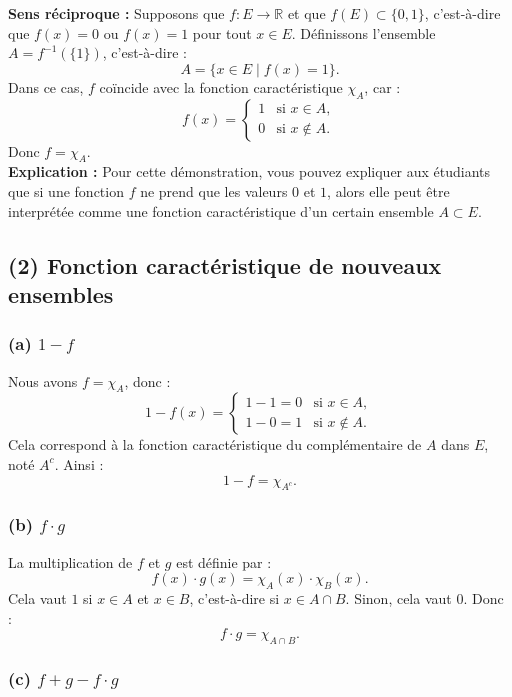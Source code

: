 \documentclass[a4paper,oneside,12pt]{amsbook}
\theoremstyle{definition}
\theoremstyle{remark}
\begin{document}
\textbf{Sens réciproque :} Supposons que $f : E \to \mathbb{R}$ et que $f(E) \subset \{0,1\}$, c'est-à-dire que $f(x) = 0$ ou $f(x) = 1$ pour tout $x \in E$. Définissons l'ensemble $A = f^{-1}(\{1\})$, c'est-à-dire :
\[
A = \{x \in E \mid f(x) = 1\}.
\]
Dans ce cas, $f$ coïncide avec la fonction caractéristique $\chi_A$, car :
\[
f(x) =
\begin{cases} 
1 & \text{si } x \in A, \\
0 & \text{si } x \notin A.
\end{cases}
\]
Donc $f = \chi_A$. \\

\textbf{Explication :} Pour cette démonstration, vous pouvez expliquer aux étudiants que si une fonction $f$ ne prend que les valeurs $0$ et $1$, alors elle peut être interprétée comme une fonction caractéristique d'un certain ensemble $A \subset E$.

\subsection*{(2) Fonction caractéristique de nouveaux ensembles}

\subsubsection*{(a) $1 - f$}

Nous avons $f = \chi_A$, donc :
\[
1 - f(x) = 
\begin{cases} 
1 - 1 = 0 & \text{si } x \in A, \\
1 - 0 = 1 & \text{si } x \notin A.
\end{cases}
\]
Cela correspond à la fonction caractéristique du complémentaire de $A$ dans $E$, noté $A^c$. Ainsi :
\[
1 - f = \chi_{A^c}.
\]

\subsubsection*{(b) $f \cdot g$}

La multiplication de $f$ et $g$ est définie par :
\[
f(x) \cdot g(x) = \chi_A(x) \cdot \chi_B(x).
\]
Cela vaut $1$ si $x \in A$ et $x \in B$, c'est-à-dire si $x \in A \cap B$. Sinon, cela vaut $0$. Donc :
\[
f \cdot g = \chi_{A \cap B}.
\]

\subsubsection*{(c) $f + g - f \cdot g$}
\end{document}
